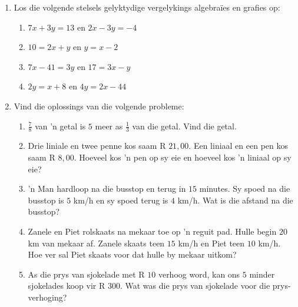 \begin{eocexercises}{}
\begin{enumerate}[itemsep=5pt, label=\textbf{\arabic*}. ]
\item Los die volgende stelsels gelyktydige vergelykings algebra\"ies en grafies op:
\begin{multicols}{2}
\begin{enumerate}[itemsep=2pt,label=\textbf{(\alph*)}]
\item $7x+3y=13$ en $2x-3y=-4$  
\item $10=2x+y$ en $y=x-2$
\item $7x-41=3y$ en $17=3x-y$
\item $2y=x+8$ en $4y=2x-44$
\end{enumerate}
\end{multicols}
\item Vind die oplossings van die volgende probleme:
\begin{enumerate}[itemsep=2pt,label=\textbf{(\alph*)}]
\item $\frac{7}{8}$ van ’n getal is $5$ meer as $\frac{1}{3}$ van die getal. Vind die getal.

\item Drie liniale en twee penne kos saam R $21,00$. Een liniaal en een pen kos saam R
$8,00$. Hoeveel kos ’n pen op sy eie en hoeveel kos ’n liniaal op sy eie?

\item ’n Man hardloop na die busstop en terug in $15$ minutes. Sy spoed na die busstop is
$5$ km/h en sy spoed terug is $4$ km/h. Wat is die afstand na die busstop?
\item Zanele en Piet rolskaats na mekaar toe op ’n reguit pad. Hulle begin $20$ km van
mekaar af. Zanele skaats teen $15$ km/h en Piet teen $10$ km/h. Hoe ver sal Piet skaats
voor dat hulle by mekaar uitkom?

\item As die prys van sjokelade met R $10$ verhoog word, kan ons $5$ minder sjokelades
koop vir R $300$. Wat was die prys van sjokelade voor die prys-verhoging?
\end{enumerate}
\end{enumerate}

\end{eocexercises}


